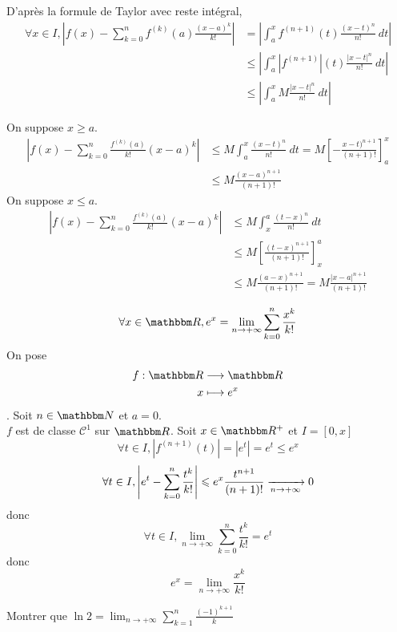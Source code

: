 \begin{prv}
	D'après la formule de Taylor avec reste intégral,
	\begin{align*}
		\forall x \in I,
		\left| f(x) - \sum_{k=0}^{n} f^{(k)}(a)  \frac{(x-a)^{k}}{k!} \right| 
		&= \left| \int_{a}^{x} f^{(n+1)}(t) \frac{(x-t)^{n}}{n!} ~dt  \right|  \\
		&\le \left| \int_{a}^{x} \left| f^{(n+1)} \right| (t) \frac{\left| x-t \right|^n}{n!}~dt  \right| \\
		&\le \left| \int_{a}^{x} M \frac{\left| x-t \right| ^{n}}{n!}~dt  \right| 
	\end{align*}

	On suppose $x \ge a$.
	\begin{align*}
		\left| f(x) - \sum_{k=0}^{n} \frac{f^{(k)}(a)}{k!} (x-a)^{k} \right|
		&\le M \int_{a}^{x} \frac{(x-t)^n}{n!}~dt = M \left[ -\frac{x-t)^{n+1}}{(n+1)!} \right] _a^x\\
		&\le M \frac{(x-a)^{n+1}}{(n+1)!}
	\end{align*}
	\vspace{2mm}
	On suppose $x \le a$.
	\begin{align*}
		\left| f(x) - \sum_{k=0}^{n} \frac{f^{(k)}(a)}{k!}(x-a)^k \right| 
		&\le M \int_{x}^{a} \frac{(t-x)^n}{n!}~dt\\
		&\le M \left[ \frac{(t-x)^{n+1}}{(n+1)!} \right] ^a_x\\
		&\le M \frac{(a-x)^{n+1}}{(n+1)!} = M \frac{\left| x-a \right| ^{n+1}}{(n+1)!}
	\end{align*}
\end{prv}

\begin{exm}
	\[
		\forall x \in \R, e^x = \lim_{n\to +\infty} \sum_{k=0}^{n} \frac{x^k}{k!}
	\] On pose \begin{align*}
		f: \R &\longrightarrow \R \\
		x &\longmapsto e^x
	\end{align*}. Soit $n \in \N$ et $a = 0$.\\
	$f$ est de classe $\mathcal{C}^1$ sur $\R$. Soit $x \in \R^+$ et $I = [0,x]$ \[
		\forall t \in I, \left| f^{(n+1)}(t) \right| = \left| e^t \right|  = e^t \le e^x
	\] \[
		\forall t \in I, 
		\left| e^t - \sum_{k = 0}^n \frac{t^k}{k!} \right| \leqslant e^x \frac{t^{n+1}}{(n+1)!} \xrightarrow[n\to +\infty]{} 0
	\] donc \[
		\forall t \in I, \lim_{n \to +\infty} \sum_{k = 0}^n \frac{t^k}{k!}= e^t
	\] donc \[
		e^x = \lim_{n\to +\infty}\frac{x^k}{k!}
	\]
\end{exm}

\begin{exo}
	Montrer que $\ln 2 = \lim_{n\to +\infty} \sum_{k=1}^{n} \frac{(-1)^{k+1}}{k}$
\end{exo}















